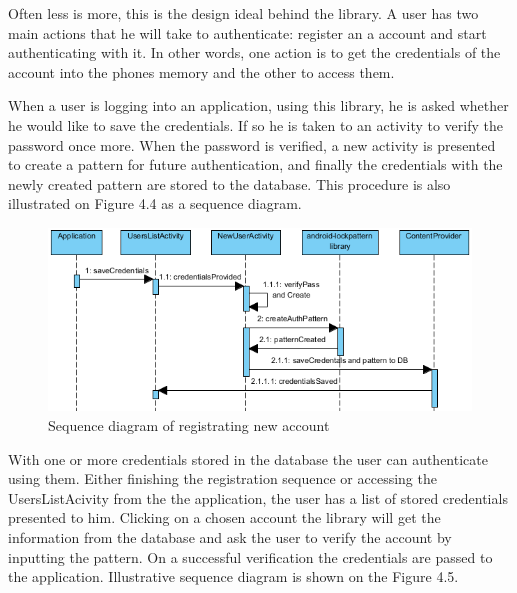 Often less is more, this is the design ideal behind the library. A user has two main actions that he will take to authenticate: register an a account and start authenticating with it. In other words, one action is to get the credentials of the account into the phones memory and the other to access them.
 
When a user is logging into an application, using this library, he is asked whether he would like to save the credentials. If so he is taken to an activity to verify the password once more. When the password is verified, a new activity is presented to create a pattern for future authentication, and finally the credentials with the newly created pattern are stored to the database. This procedure is also illustrated on Figure 4.4 as a sequence diagram.

\begin{figure}[h]
\begin{center}
\includegraphics[scale=0.9]{images/sequencediagramnew.png}
\caption{Sequence diagram of registrating new account} \label{fig:sequence diagram} 
\end{center}
\end{figure}

With one or more credentials stored in the database the user can authenticate using them. Either finishing the registration sequence or accessing the UsersListAcivity from the the application, the user has a list of stored credentials presented to him. Clicking on a chosen account the library will get the information from the database and ask the user to verify the account by inputting the pattern. On a successful verification the credentials are passed to the application. Illustrative sequence diagram is shown on the Figure 4.5.

